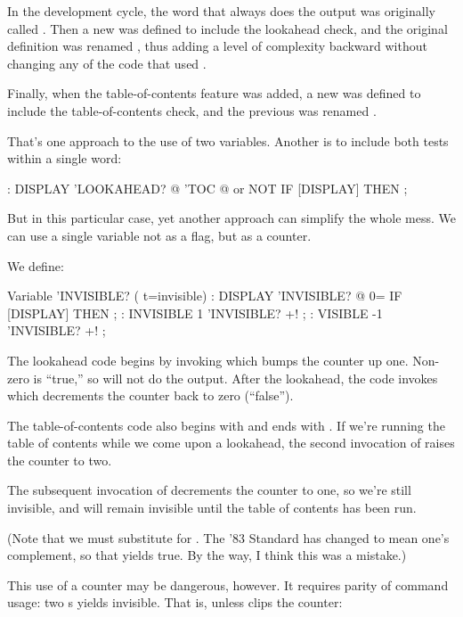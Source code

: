 In the development cycle, the word \forth{[DISPLAY]} that always does
the output was originally called . Then a new
 was defined to include the lookahead check, and the
original definition was renamed \forth{[DISPLAY]}, thus adding a level
of complexity backward without changing any of the code that used
.

Finally, when the table-of-contents feature was added, a new
 was defined to include the table-of-contents check,
and the previous  was renamed .

That's one approach to the use of two variables. Another is to include
both tests within a single word:

\begin{Code}
: DISPLAY   'LOOKAHEAD? @  'TOC @ or  NOT IF [DISPLAY] THEN ;
\end{Code}
But in this particular case, yet another approach can simplify the whole
mess. We can use a single variable not as a flag, but as a counter.

We define:

\begin{Code}
Variable 'INVISIBLE?  ( t=invisible)
: DISPLAY   'INVISIBLE? @  0= IF [DISPLAY] THEN ;
: INVISIBLE   1 'INVISIBLE? +! ;
: VISIBLE    -1 'INVISIBLE? +! ;
\end{Code}
The lookahead code begins by invoking  which bumps
the counter up one. Non-zero is ``true,'' so  will not
do the output.  After the lookahead, the code invokes 
which decrements the counter back to zero (``false'').

The table-of-contents code also begins with  and ends
with . If we're running the table of contents while
we come upon a lookahead, the second invocation of 
raises the counter to two.

The subsequent invocation of  decrements the counter
to one, so we're still invisible, and will remain invisible until the
table of contents has been run.

(Note that we must substitute  for . The '83
Standard has changed  to mean one's complement, so that
 yields true. By the way, I think this was a mistake.)

This use of a counter may be dangerous, however. It requires parity of
command usage: two s yields invisible. That is, unless
 clips the counter:

